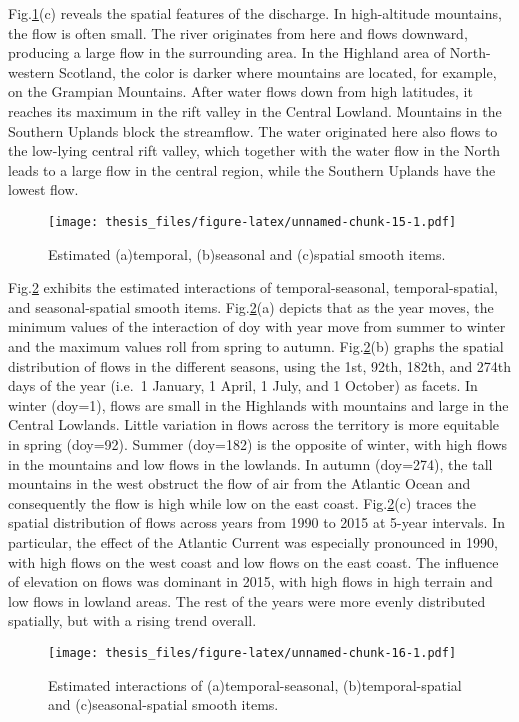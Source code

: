 \documentclass[12pt,oneside]{reedthesis}
\begin{document}
Fig.\ref{fig:what}(c) reveals the spatial features of the discharge. In high-altitude mountains, the flow is often small. The river originates from here and flows downward, producing a large flow in the surrounding area. In the Highland area of North-western Scotland, the color is darker where mountains are located, for example, on the Grampian Mountains. After water flows down from high latitudes, it reaches its maximum in the rift valley in the Central Lowland. Mountains in the Southern Uplands block the streamflow. The water originated here also flows to the low-lying central rift valley, which together with the water flow in the North leads to a large flow in the central region, while the Southern Uplands have the lowest flow.
\begin{figure}
\centering
\texttt{[image: thesis\_files/figure-latex/unnamed-chunk-15-1.pdf]}
\caption{\label{fig:unnamed-chunk-15}\label{fig:what} Estimated (a)temporal, (b)seasonal and (c)spatial smooth items.}
\end{figure}
Fig.\ref{fig:sha} exhibits the estimated interactions of temporal-seasonal, temporal-spatial, and seasonal-spatial smooth items. Fig.\ref{fig:sha}(a) depicts that as the year moves, the minimum values of the interaction of doy with year move from summer to winter and the maximum values roll from spring to autumn. Fig.\ref{fig:sha}(b) graphs the spatial distribution of flows in the different seasons, using the 1st, 92th, 182th, and 274th days of the year (i.e.~1 January, 1 April, 1 July, and 1 October) as facets. In winter (doy=1), flows are small in the Highlands with mountains and large in the Central Lowlands. Little variation in flows across the territory is more equitable in spring (doy=92). Summer (doy=182) is the opposite of winter, with high flows in the mountains and low flows in the lowlands. In autumn (doy=274), the tall mountains in the west obstruct the flow of air from the Atlantic Ocean and consequently the flow is high while low on the east coast. Fig.\ref{fig:sha}(c) traces the spatial distribution of flows across years from 1990 to 2015 at 5-year intervals. In particular, the effect of the Atlantic Current was especially pronounced in 1990, with high flows on the west coast and low flows on the east coast. The influence of elevation on flows was dominant in 2015, with high flows in high terrain and low flows in lowland areas. The rest of the years were more evenly distributed spatially, but with a rising trend overall.
\begin{figure}
\centering
\texttt{[image: thesis\_files/figure-latex/unnamed-chunk-16-1.pdf]}
\caption{\label{fig:unnamed-chunk-16}\label{fig:sha} Estimated interactions of (a)temporal-seasonal, (b)temporal-spatial and (c)seasonal-spatial smooth items.}
\end{figure}
\end{document}
